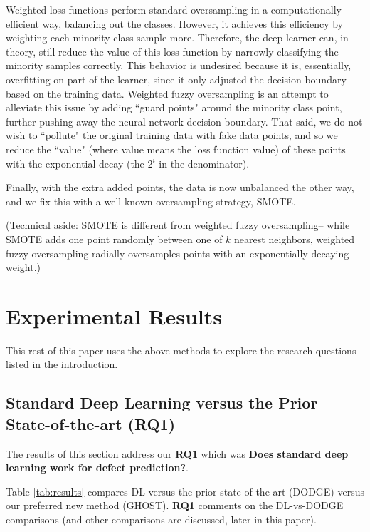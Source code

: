 \documentclass[10pt,compsoc,twocolumn]{IEEEtran}
\newcommand{\respto}[1]{
\fcolorbox{black}{black!15}{%
\label{resp:#1}%
\bf\scriptsize R{#1}}}
\newcommand{\BLUE}{\color{blue}}
\newcommand{\BLACK}{\color{black}}
\begin{document}
\BLUE
Weighted loss functions perform standard oversampling in a computationally efficient way, balancing out the classes. However, it achieves this efficiency by weighting each minority class sample more. Therefore, the deep learner can, in theory, still reduce the value of this loss function by narrowly classifying the minority samples correctly. This behavior is undesired because it is, essentially, overfitting on part of the learner, since it only adjusted the decision boundary based on the training data. Weighted fuzzy oversampling is an attempt to alleviate this issue by adding ``guard points" around the minority class point, further pushing away the neural network decision boundary. That said, we do not wish to ``pollute" the original training data with fake data points, and so we reduce the ``value" (where value means the loss function value) of these points with the exponential decay (the $2^i$ in the denominator).

Finally, with the extra added points, the data is now unbalanced the other way, and we fix this with a well-known oversampling strategy, SMOTE.
\respto{1a3.1}
\BLACK

(Technical aside:  SMOTE is different from weighted fuzzy oversampling-- while SMOTE adds one point randomly between one of $k$ nearest neighbors, weighted fuzzy oversampling radially oversamples points with an exponentially decaying weight.)




\section{Experimental Results}
\label{sec:results}

This rest of this paper uses the above methods to explore the research questions listed in
the introduction.

\subsection{Standard Deep Learning versus the Prior State-of-the-art ({\bf RQ1})}
\label{sec:rq1}



The results of this section address our {\bf RQ1} which was 
{\bf Does standard deep learning work for defect prediction?}.


Table \ref{tab:results} compares DL versus the prior state-of-the-art (DODGE) versus
our preferred new method (GHOST). {\bf RQ1} comments on the DL-vs-DODGE comparisons (and other comparisons are discussed, later in this paper).
\end{document}
